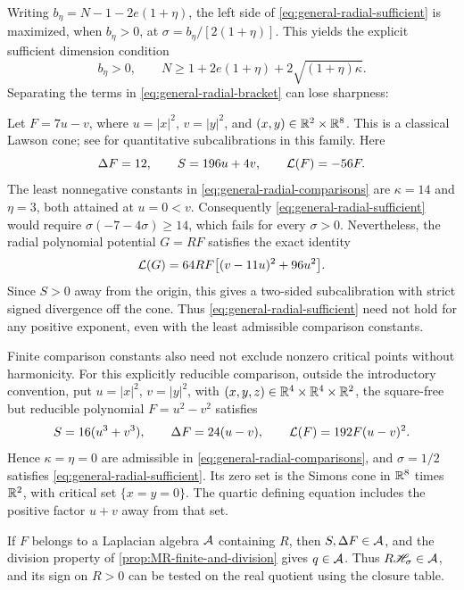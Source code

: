 Writing \(b_\eta=N-1-2e(1+\eta)\), the left side of
\eqref{eq:general-radial-sufficient} is maximized, when
\(b_\eta>0\), at \(\sigma=b_\eta/[2(1+\eta)]\).
This yields the explicit sufficient dimension condition
\begin{equation}\label{eq:general-radial-dimension}
 b_\eta>0,\qquad
 N\ge1+2e(1+\eta)+2\sqrt{(1+\eta)\kappa}.
\end{equation}
Separating the terms in \eqref{eq:general-radial-bracket} can lose sharpness:

\begin{example}
\label{ex:radial-separated-nonsharp}
Let \(F=7u-v\), where \(u=|x|^2\), \(v=|y|^2\), and
\((x,y)\in\mathbb R^2\times\mathbb R^8\). This is a classical Lawson cone;
see \cite{Liu19} for quantitative subcalibrations in this family.
Here
\[
 \Delta F=12,\qquad S=196u+4v,\qquad \mathcal L(F)=-56F.
\]
The least nonnegative constants in
\eqref{eq:general-radial-comparisons} are
\(\kappa=14\) and \(\eta=3\), both attained at \(u=0<v\).
Consequently \eqref{eq:general-radial-sufficient} would require
\(\sigma(-7-4\sigma)\ge14\), which fails for every
\(\sigma>0\). Nevertheless, the radial polynomial potential
\(G=RF\) satisfies the exact identity
\begin{equation}\label{eq:radial-Lawson-counterexample}
 \mathcal L(G)=64RF\bigl[(v-11u)^2+96u^2\bigr].
\end{equation}
Since \(S>0\) away from the origin, this gives a two-sided
subcalibration with strict signed divergence off the cone.
Thus \eqref{eq:general-radial-sufficient} need not hold for any
positive exponent, even with the least admissible comparison constants.
\end{example}

Finite comparison constants also need not exclude nonzero critical
points without harmonicity. For this explicitly reducible comparison,
outside the introductory convention, put \(u=|x|^2\), \(v=|y|^2\), with
\((x,y,z)\in\mathbb R^4\times\mathbb R^4\times\mathbb R^2\), the square-free
but reducible polynomial \(F=u^2-v^2\) satisfies
\[
 S=16(u^3+v^3),\qquad \Delta F=24(u-v),\qquad
 \mathcal L(F)=192F(u-v)^2.
\]
Hence \(\kappa=\eta=0\) are admissible in
\eqref{eq:general-radial-comparisons}, and \(\sigma=1/2\)
satisfies \eqref{eq:general-radial-sufficient}. Its zero set is the
Simons cone in \(\mathbb R^8\) times \(\mathbb R^2\), with critical set
\(\{x=y=0\}\). The quartic defining equation includes the
positive factor \(u+v\) away from that set.

If \(F\) belongs to a Laplacian algebra \(\mathcal A\) containing
\(R\), then \(S,\Delta F\in\mathcal A\), and the division property
of \cref{prop:MR-finite-and-division} gives \(q\in\mathcal A\).
Thus \(R\mathscr H_\sigma\in\mathcal A\), and its sign on \(R>0\)
can be tested on the real quotient using the closure table.

